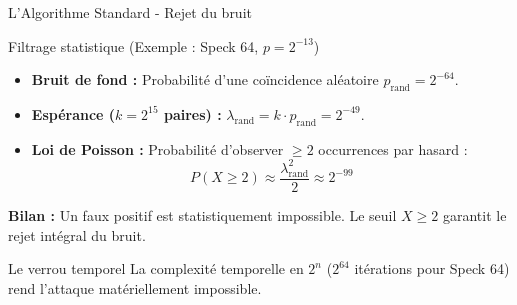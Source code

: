 \begin{frame}{L'Algorithme Standard - Rejet du bruit}

    \begin{block}{Filtrage statistique (Exemple : Speck 64, $p = 2^{-13}$)}
        \begin{itemize}
            \item \textbf{Bruit de fond :} Probabilité d'une coïncidence aléatoire $p_{\text{rand}} = 2^{-64}$.
            \item \textbf{Espérance (\boldmath$k = 2^{15}$ paires\unboldmath) :} $\lambda_{\text{rand}} = k \cdot p_{\text{rand}} = 2^{-49}$.
            \item \textbf{Loi de Poisson :} Probabilité d'observer $\ge 2$ occurrences par hasard :
            \begin{equation*}
                P(X \ge 2) \approx \frac{\lambda_{\text{rand}}^2}{2} \approx 2^{-99}
            \end{equation*}
        \end{itemize}
    \end{block}

    \vspace{0.2cm}
    \textbf{Bilan :} Un faux positif est statistiquement impossible. Le seuil $X \ge 2$ garantit le rejet intégral du bruit.

    \vspace{0.4cm}
    \begin{alertblock}{Le verrou temporel}
        La complexité temporelle en $2^n$ ($2^{64}$ itérations pour Speck 64) rend l'attaque matériellement impossible.
    \end{alertblock}
    
\end{frame}
